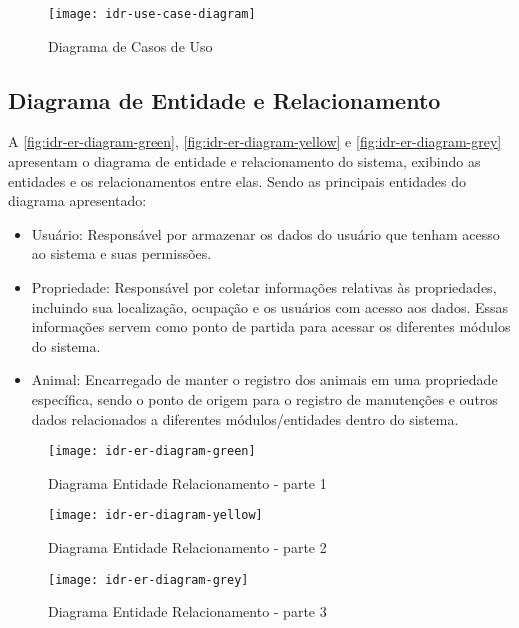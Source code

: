 \begin{figure}[htpb]
  \captionsetup{width=0.5\textwidth}
  \caption{Diagrama de Casos de Uso}
  \label{fig:casosDeUso}
  \texttt{[image: idr-use-case-diagram]}
  \fonte{}
\end{figure}

\clearpage

\subsection{Diagrama de Entidade e Relacionamento}\label{subsec:diagramaEntidadeRelacionamento}

A \autoref{fig:idr-er-diagram-green}, \autoref{fig:idr-er-diagram-yellow} e \autoref{fig:idr-er-diagram-grey} apresentam o diagrama de entidade e relacionamento do sistema, exibindo as entidades e os relacionamentos entre elas. Sendo as principais entidades do diagrama apresentado:

\begin{itemize}
  \item Usuário: Responsável por armazenar os dados do usuário que tenham acesso ao sistema e suas permissões.
  \item Propriedade: Responsável por coletar informações relativas às propriedades, incluindo sua localização, ocupação e os usuários com acesso aos dados. Essas informações servem como ponto de partida para acessar os diferentes módulos do sistema.
  \item Animal: Encarregado de manter o registro dos animais em uma propriedade específica, sendo o ponto de origem para o registro de manutenções e outros dados relacionados a diferentes módulos/entidades dentro do sistema.
\end{itemize}

\begin{figure}[htpb]
  \captionsetup{width=0.6\textwidth}
  \caption{Diagrama Entidade Relacionamento - parte 1}
  \label{fig:idr-er-diagram-green}
  \texttt{[image: idr-er-diagram-green]}
  \fonte{}
\end{figure}

\begin{figure}[htpb]
  \captionsetup{width=0.6\textwidth}
  \caption{Diagrama Entidade Relacionamento - parte 2}
  \label{fig:idr-er-diagram-yellow}
  \texttt{[image: idr-er-diagram-yellow]}
  \fonte{}
\end{figure}

\begin{figure}[htpb]
  \captionsetup{width=0.6\textwidth}
  \caption{Diagrama Entidade Relacionamento - parte 3}
  \label{fig:idr-er-diagram-grey}
  \texttt{[image: idr-er-diagram-grey]}
  \fonte{}
\end{figure}
